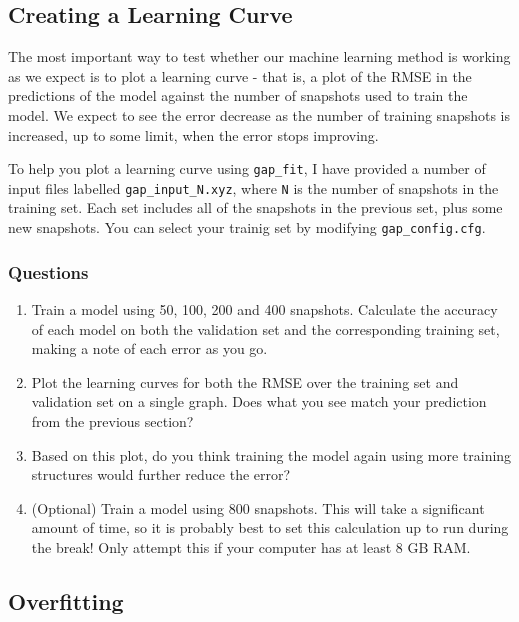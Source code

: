 \documentclass{article}
\begin{document}
\subsection{Creating a Learning Curve}

The most important way to test whether our machine learning method is working as we expect is to plot a learning curve - that is, a plot of the RMSE in the predictions of the model against the number of snapshots used to train the model. We expect to see the error decrease as the number of training snapshots is increased, up to some limit, when the error stops improving.

To help you plot a learning curve using \verb|gap_fit|, I have provided a number of input files labelled \verb|gap_input_N.xyz|, where \verb|N| is the number of snapshots in the training set. Each set includes all of the snapshots in the previous set, plus some new snapshots. You can select your trainig set by modifying \verb|gap_config.cfg|.

\subsubsection*{Questions}

\begin{enumerate}

\item Train a model using 50, 100, 200 and 400 snapshots. Calculate the accuracy of each model on both the validation set and the corresponding training set, making a note of each error as you go.
\item Plot the learning curves for both the RMSE over the training set and validation set on a single graph. Does what you see match your prediction from the previous section?
\item Based on this plot, do you think training the model again using more training structures would further reduce the error?
\item (Optional) Train a model using 800 snapshots. This will take a significant amount of time, so it is probably best to set this calculation up to run during the break! Only attempt this if your computer has at least 8 GB RAM.

\end{enumerate}

\subsection{Overfitting}
\end{document}
